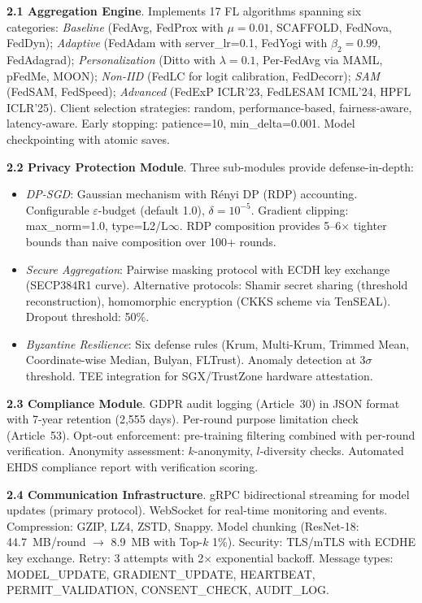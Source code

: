 \documentclass[conference]{IEEEtran}
\begin{document}
\textbf{2.1 Aggregation Engine}. Implements 17 FL algorithms spanning six categories: \textit{Baseline} (FedAvg, FedProx with $\mu{=}0.01$, SCAFFOLD, FedNova, FedDyn); \textit{Adaptive} (FedAdam with server\_lr=0.1, FedYogi with $\beta_2{=}0.99$, FedAdagrad); \textit{Personalization} (Ditto with $\lambda{=}0.1$, Per-FedAvg via MAML, pFedMe, MOON); \textit{Non-IID} (FedLC for logit calibration, FedDecorr); \textit{SAM} (FedSAM, FedSpeed); \textit{Advanced} (FedExP ICLR'23, FedLESAM ICML'24, HPFL ICLR'25). Client selection strategies: random, performance-based, fairness-aware, latency-aware. Early stopping: patience=10, min\_delta=0.001. Model checkpointing with atomic saves.

\textbf{2.2 Privacy Protection Module}. Three sub-modules provide defense-in-depth:
\begin{itemize}
    \item \textit{DP-SGD}: Gaussian mechanism with R\'enyi DP (RDP) accounting. Configurable $\varepsilon$-budget (default 1.0), $\delta{=}10^{-5}$. Gradient clipping: max\_norm=1.0, type=L2/L$\infty$. RDP composition provides 5--6$\times$ tighter bounds than naive composition over 100+ rounds.
    \item \textit{Secure Aggregation}: Pairwise masking protocol with ECDH key exchange (SECP384R1 curve). Alternative protocols: Shamir secret sharing (threshold reconstruction), homomorphic encryption (CKKS scheme via TenSEAL). Dropout threshold: 50\%.
    \item \textit{Byzantine Resilience}: Six defense rules (Krum, Multi-Krum, Trimmed Mean, Coordinate-wise Median, Bulyan, FLTrust). Anomaly detection at 3$\sigma$ threshold. TEE integration for SGX/TrustZone hardware attestation.
\end{itemize}

\textbf{2.3 Compliance Module}. GDPR audit logging (Article~30) in JSON format with 7-year retention (2,555 days). Per-round purpose limitation check (Article~53). Opt-out enforcement: pre-training filtering combined with per-round verification. Anonymity assessment: $k$-anonymity, $l$-diversity checks. Automated EHDS compliance report with verification scoring.

\textbf{2.4 Communication Infrastructure}. gRPC bidirectional streaming for model updates (primary protocol). WebSocket for real-time monitoring and events. Compression: GZIP, LZ4, ZSTD, Snappy. Model chunking (ResNet-18: 44.7~MB/round $\to$ 8.9~MB with Top-$k$ 1\%). Security: TLS/mTLS with ECDHE key exchange. Retry: 3 attempts with 2$\times$ exponential backoff. Message types: MODEL\_UPDATE, GRADIENT\_UPDATE, HEARTBEAT, PERMIT\_VALIDATION, CONSENT\_CHECK, AUDIT\_LOG.
\end{document}
